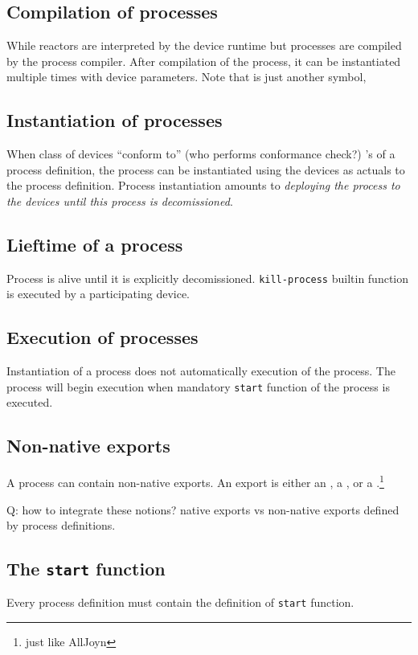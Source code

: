\documentclass{note}\usepackage{mathptm,mydef}
\begin{document}
\subsection{Compilation of processes}
While reactors are interpreted by the device runtime but processes are
compiled by the process compiler. 
After compilation of the process, it can be instantiated multiple times with
device parameters.
Note that {\em {}} is just another symbol, 

\subsection{Instantiation of processes}
When class of devices ``conform to'' (who performs conformance check?)
's of a process definition, the process can be instantiated
using the devices as actuals to the process definition. Process instantiation
amounts to {\em deploying the 
  process to the devices until this process is decomissioned\/}. 

\subsection{Lieftime of a process}
Process is alive until 
\bit
\w it is explicitly decomissioned.
\w \verb+kill-process+ builtin function is executed by a participating device.
\eit

\subsection{Execution of processes}
Instantiation of a process does not automatically execution of the process.
The process will begin execution when mandatory \verb+start+ function of the
process is executed.

\subsection{Non-native exports}
A process can contain non-native exports. An export is either an , a
, or a .\footnote{just like AllJoyn}

Q: how to integrate these notions? native exports vs non-native exports defined
by process definitions.

\subsection{The \texttt{start} function}
Every process definition must contain the definition of \verb+start+ function.
\end{document}
